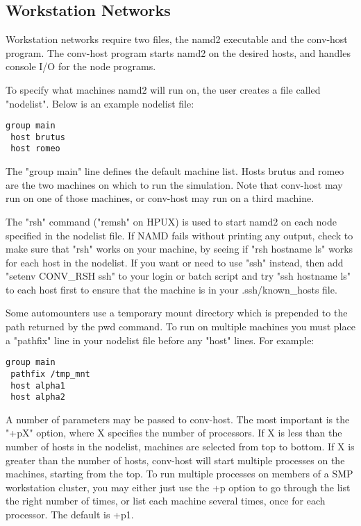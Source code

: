 \subsection{Workstation Networks}

Workstation networks require two files, the namd2 executable and the
conv-host program.  The conv-host program starts namd2 on the desired
hosts, and handles console I/O for the node programs.

To specify what machines namd2 will run on, the user creates a file
called "nodelist".  Below is an example nodelist file:

\begin{verbatim}
group main
 host brutus
 host romeo
\end{verbatim}

The "group main" line defines the default machine list.  Hosts brutus
and romeo are the two machines on which to run the simulation.  Note
that conv-host may run on one of those machines, or conv-host may run
on a third machine.

The "rsh" command ("remsh" on HPUX) is used to start namd2 on each node
specified in the nodelist file.  If NAMD fails without printing any
output, check to make sure that "rsh" works on your machine, by seeing
if "rsh hostname ls" works for each host in the nodelist.  If you want
or need to use "ssh" instead, then add "setenv CONV\_RSH ssh" to your
login or batch script and try "ssh hostname ls" to each host first to
ensure that the machine is in your .ssh/known\_hosts file.

Some automounters use a temporary mount directory which is prepended
to the path returned by the pwd command.  To run on multiple machines
you must place a "pathfix" line in your nodelist file before any
"host" lines.  For example:

\begin{verbatim}
group main
 pathfix /tmp_mnt
 host alpha1
 host alpha2
\end{verbatim}

A number of parameters may be passed to conv-host.  The most important
is the "+pX" option, where X specifies the number of processors.  If X
is less than the number of hosts in the nodelist, machines are
selected from top to bottom.  If X is greater than the number of
hosts, conv-host will start multiple processes on the machines,
starting from the top.  To run multiple processes on members of a SMP
workstation cluster, you may either just use the +p option to go
through the list the right number of times, or list each machine
several times, once for each processor.  The default is +p1.

